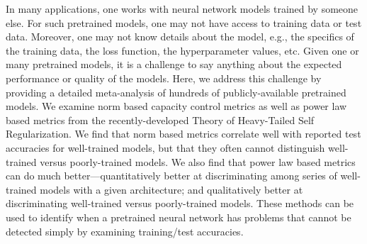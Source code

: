 
In many applications, one works with neural network models trained by someone else.
For such pretrained models, one may not have access to training data or test data.
Moreover, one may not know details about the model, e.g., the specifics of the training data, the loss function, the hyperparameter values, etc.
Given one or many pretrained models, it is a challenge to say anything about the expected performance or quality of the models.
Here, we address this challenge by providing a detailed meta-analysis of hundreds of publicly-available pretrained models.
We examine norm based capacity control metrics as well as power law based metrics from the recently-developed Theory of Heavy-Tailed Self Regularization.
We find that norm based metrics correlate well with reported test accuracies for well-trained models, but that they often cannot distinguish well-trained versus poorly-trained models.
We also find that power law based metrics can do much better---quantitatively better at discriminating among series of well-trained models with a given architecture; and qualitatively better at discriminating well-trained versus poorly-trained models. 
These methods can be used to identify when a pretrained neural network has problems that cannot be detected simply by examining training/test accuracies.

